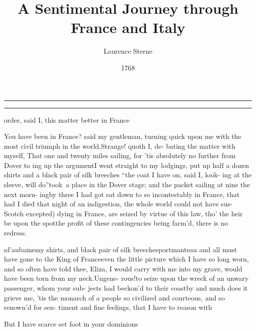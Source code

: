 \documentclass[twoside]{article}
\title{A Sentimental Journey through France and Italy}
\author{Laurence Sterne}
\date{1768}
\begin{document}
\def\vol{I}
\fontsize{11}{15}\selectfont
\setcounter{page}{1}
\pagestyle{folio}
\thispagestyle{empty}
\hrule
\vskip 2pt
\hrule
\noindent
{}

\vskip 16pt

 order, said I, this\break
matter better in France\tsk

\tsk You have been in France? said 
my gentleman, turning quick upon 
me with the most civil triumph in 
the world.\tsk Strange! quoth I, de-
bating the matter with myself, That 
one and twenty miles sailing, for ’tis 
absolutely no further from Dover to 
ing up the argument\tsk I went straight
to my lodgings, put up half a dozen
shirts and a black pair of silk breeches
\tsk “the coat I have on, said I, look-
ing at the sleeve, will do”\tsk took~a 
place in the Dover stage; and the
packet sailing at nine the next morn-
ing\tsk by three I had got sat down to 
so incontestably in France, that had 
I died that night of an indigestion, 
the whole world could not have sus-
\vfill %
\bgroup\fontsize{9}{12}\selectfont\noindent
{}
Scotch excepted) dying in France, are seized 
by virtue of this law, tho’ the heir be upon 
the spot\tsh the profit of these contingencies 
being farm’d, there is no redress.\par\egroup
{}
\i{d’aubaine}\tsk my shirts, and black pair 
of silk breeches\tsk portmanteau and 
all must have gone to the King of 
France\tsk even the little picture which 
I have so long worn, and so often 
have told thee, Eliza, I would carry 
with me into my grave, would have 
been torn from my neck.\tsk Ungene-
rous!\tsk to seize upon the wreck of an 
unwary passenger, whom your sub-
jects had beckon’d to their coast\tsk by 
and much does it grieve me, ’tis the 
monarch of a people so civilized and 
courteous, and so renown’d for sen-
timent and fine feelings, that I have 
to reason with\tsh

But I have scarce set foot in your\break
dominions\tsh
\end{document}
